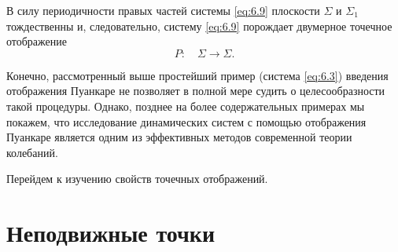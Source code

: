 В силу периодичности правых частей системы \eqref{eq:6.9} плоскости
$\Sigma$ и $\Sigma_1$ тождественны и, следовательно, систему \eqref{eq:6.9} порождает двумерное точечное отображение
\begin{equation}
        \label{eq:}
        P: \quad \Sigma \to \Sigma.
\end{equation}

Конечно, рассмотренный выше простейший пример (система \eqref{eq:6.3})
введения отображения Пуанкаре не позволяет в полной мере судить о
целесообразности такой процедуры. Однако, позднее на более содержательных
примерах мы покажем, что исследование динамических систем с помощью
отображения Пуанкаре является одним из эффективных методов современной теории колебаний.

Перейдем к изучению свойств точечных отображений.

\section{Неподвижные точки}%
\label{sec:6.3}

